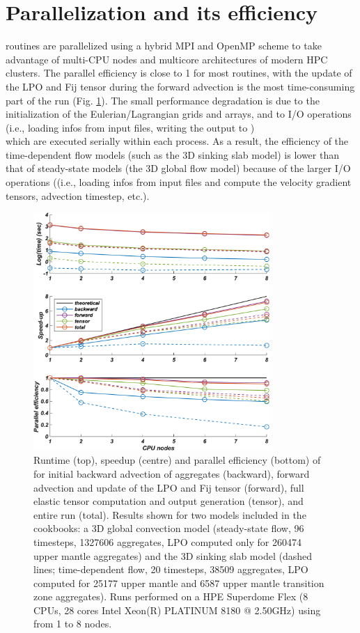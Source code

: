 \section{Parallelization and its efficiency}
\drexmtitle{} routines are parallelized using a hybrid MPI and OpenMP scheme to take advantage of multi-CPU nodes and multicore architectures of modern HPC clusters. The parallel efficiency is close to 1 for most routines, with the update of the LPO and Fij tensor during the forward advection is the most time-consuming part of the run (Fig. \ref{fig:scalability}). The small performance degradation is due to the initialization of the Eulerian/Lagrangian grids and arrays, and to I/O operations (i.e., loading infos from input \vtptitle{} files, writing the output to \cijkltitle{})\\ which are executed serially within each process. As a result, the efficiency of the time-dependent flow models (such as the 3D sinking slab model) is lower than that of steady-state models (the 3D global flow model) because of the larger I/O operations ((i.e., loading infos from input \vtptitle{} files and compute the velocity gradient tensors, advection timestep, etc.).

\begin{figure}
    \centering
    \includegraphics[width=0.8\textwidth]{DREX_M/drexm_time_speedup_scalability_log10.png}
    \caption{Runtime (top), speedup (centre) and parallel efficiency (bottom) of \drexmtitle{} for initial backward advection of aggregates (backward), forward advection and update of the LPO and Fij tensor (forward), full elastic tensor computation and output generation (tensor), and entire run (total). Results shown for two models included in the cookbooks: a 3D global convection model (steady-state flow, 96 timesteps, 1327606 aggregates, LPO computed only for 260474 upper mantle aggregates) and the 3D sinking slab model (dashed lines; time-dependent flow, 20 timesteps, 38509 aggregates, LPO computed for 25177 upper mantle and 6587 upper mantle transition zone aggregates). Runs performed on a HPE Superdome Flex (8 CPUs, 28 cores Intel Xeon(R) PLATINUM 8180 @ 2.50GHz) using from 1 to 8 nodes.
    }
    \label{fig:scalability}
\end{figure}

\vfill %